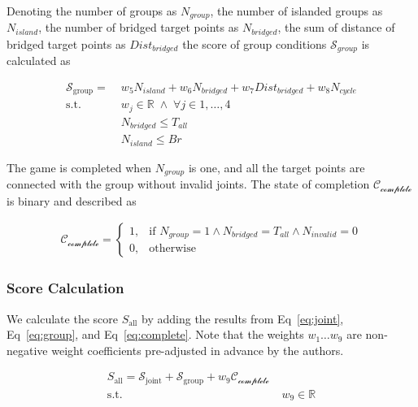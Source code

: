 Denoting the number of groups as $N_{group}$, the number of islanded groups as $N_{island}$, the number of bridged target points as $N_{bridged}$, the sum of distance of bridged target points as $Dist_{bridged}$ the score of group conditions $\mathcal{S}_{group}$ is calculated as

\begin{equation}
 \begin{aligned}
 \mathcal{S}_{\text{group}} =  &\; w_5 N_{island} + w_6 N_{bridged} + w_7 Dist_{bridged} + w_8 N_{cycle}\\
   \textrm{s.t.} & \; w_j  \in \mathbb{R} \; \wedge \;   \forall j \in 1, \dotsc , 4 \\
   & \; N_{bridged} \leq T_{all} \\
   & \; N_{island} \leq Br
 \end{aligned}
 \label{eq:group}
\end{equation}

The game is completed when $N_{group}$ is one, and all the target points are connected with the group without invalid joints.
The state of completion $\mathcal{C_\text{complete}}$ is binary and described as

\begin{equation}
 \begin{aligned}
 \mathcal{C_\text{complete}} =
 \begin{cases}
    1,  & \text{if }   N_{group} = 1 \wedge N_{bridged} = T_{all}
    \wedge  N_{invalid} = 0 \\
    0,  & \text{otherwise}
\end{cases}
 \end{aligned}
 \label{eq:complete}
\end{equation}

\subsubsection{Score Calculation}
We calculate the score $S_\text{all}$ by adding the results from Eq~\ref{eq:joint}, Eq~\ref{eq:group}, and Eq~\ref{eq:complete}.
Note that the weights $w_1 \dotso  w_9$ are non-negative weight coefficients pre-adjusted in advance by the authors.

\begin{equation}
 \begin{aligned}
 S_\text{all} = \mathcal{S}_{\text{joint}} + \mathcal{S}_{\text{group}} + w_9 \mathcal{C_\text{complete}} \\
   \textrm{s.t.} & \; w_9  \in \mathbb{R}
 \end{aligned}
 \label{eq:score}
\end{equation}
